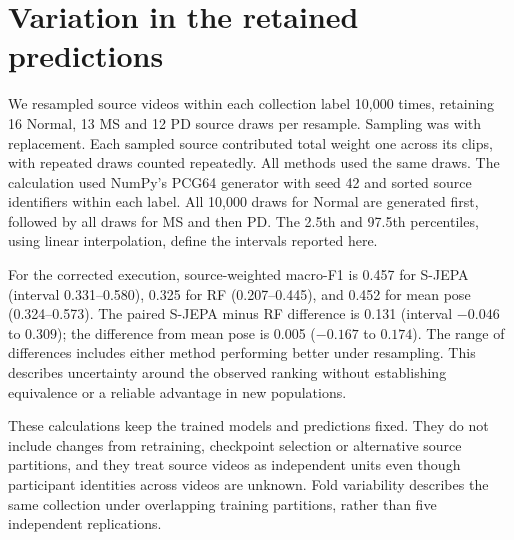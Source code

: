 \documentclass[10pt,twocolumn,letterpaper]{article}
\begin{document}
\section{Variation in the retained predictions}
We resampled source videos within each collection label 10,000 times, retaining 16 Normal, 13 MS and 12 PD source draws per resample. Sampling was with replacement. Each sampled source contributed total weight one across its clips, with repeated draws counted repeatedly. All methods used the same draws. The calculation used NumPy's PCG64 generator with seed 42 and sorted source identifiers within each label. All 10,000 draws for Normal are generated first, followed by all draws for MS and then PD. The 2.5th and 97.5th percentiles, using linear interpolation, define the intervals reported here.

For the corrected execution, source-weighted macro-F1 is 0.457 for S-JEPA (interval 0.331--0.580), 0.325 for RF (0.207--0.445), and 0.452 for mean pose (0.324--0.573). The paired S-JEPA minus RF difference is 0.131 (interval $-0.046$ to $0.309$); the difference from mean pose is 0.005 ($-0.167$ to $0.174$). The range of differences includes either method performing better under resampling. This describes uncertainty around the observed ranking without establishing equivalence or a reliable advantage in new populations.

These calculations keep the trained models and predictions fixed. They do not include changes from retraining, checkpoint selection or alternative source partitions, and they treat source videos as independent units even though participant identities across videos are unknown. Fold variability describes the same collection under overlapping training partitions, rather than five independent replications.


\FloatBarrier


\end{document}
